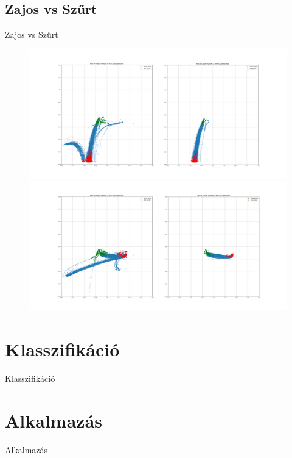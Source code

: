 \documentclass{beamer}
\begin{document}
\subsection{Zajos vs Szűrt}
\begin{frame}{Zajos vs Szűrt}
    \begin{figure}
        \includegraphics[scale=0.1]{../clustering/n_cluster_0_before_after.png}
        \includegraphics[scale=0.1]{../clustering/n_cluster_2_before_after.png}
    \end{figure}
\end{frame}

\section{Klasszifikáció}
\begin{frame}{Klasszifikáció}

\end{frame}

\section{Alkalmazás}
\begin{frame}{Alkalmazás}
    \centering
\end{frame}
\end{document}
